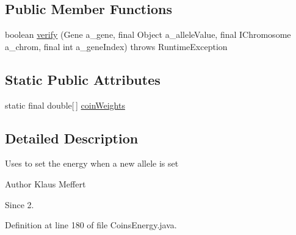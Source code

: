 \subsection*{Public Member Functions}
\begin{DoxyCompactItemize}
\item 
boolean \hyperlink{classexamples_1_1energy_1_1_coins_energy_1_1_energy_gene_constraint_checker_ae31617c18c0e2fb2c936e5994473bf3c}{verify} (Gene a\-\_\-gene, final Object a\-\_\-allele\-Value, final I\-Chromosome a\-\_\-chrom, final int a\-\_\-gene\-Index)  throws Runtime\-Exception 
\end{DoxyCompactItemize}
\subsection*{Static Public Attributes}
\begin{DoxyCompactItemize}
\item 
static final double\mbox{[}$\,$\mbox{]} \hyperlink{classexamples_1_1energy_1_1_coins_energy_1_1_energy_gene_constraint_checker_ac711f1ef6fe142a4b2a62b8b0c77c409}{coin\-Weights}
\end{DoxyCompactItemize}


\subsection{Detailed Description}
Uses to set the energy when a new allele is set \begin{DoxyAuthor}{Author}
Klaus Meffert 
\end{DoxyAuthor}
\begin{DoxySince}{Since}
2. 
\end{DoxySince}


Definition at line 180 of file Coins\-Energy.\-java.



